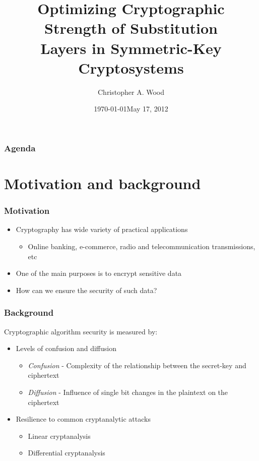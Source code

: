 \documentclass[handout]{beamer}
\title[Optimizing Substitution Layer Security]{Optimizing Cryptographic Strength of Substitution\\ Layers in Symmetric-Key Cryptosystems}
\institute[RIT]{}
\date{\today}
\author{Christopher A. Wood}
\date{May 17, 2012}
\begin{document}

\begin{frame}
	\titlepage
\end{frame}

\begin{frame}
	\frametitle{Agenda}
	\tableofcontents
\end{frame}

\section{Motivation and background}
\begin{frame}
	\frametitle{Motivation}
	\begin{itemize}
		\item Cryptography has wide variety of practical applications
		\begin{itemize}
			\item Online banking, e-commerce, radio and telecommunication transmissions, etc
		\end{itemize}
		\item One of the main purposes is to encrypt sensitive data
		\item How can we ensure the security of such data?
	\end{itemize}
\end{frame}

\begin{frame}
	\frametitle{Background}
	Cryptographic algorithm security is measured by:
	\begin{itemize}
		\item Levels of confusion and diffusion
		\begin{itemize}
			\item \emph{Confusion} - Complexity of the relationship between the secret-key and ciphertext
			\item \emph{Diffusion} - Influence of single bit changes in the plaintext on the ciphertext
		\end{itemize}
		\pause
		\item Resilience to common cryptanalytic attacks
		\begin{itemize}
			\item Linear cryptanalysis
			\item Differential cryptanalysis
		\end{itemize}
	\end{itemize}
\end{frame}
\end{document}
